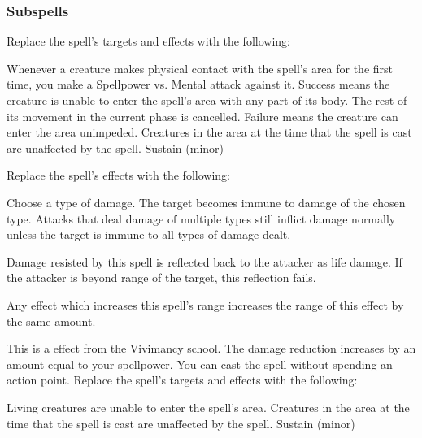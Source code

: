 \subsubsection{Subspells}
Replace the spell's targets and effects with the following:
\begin{spellcontent}
\begin{augmenttargetinginfo}
\end{augmenttargetinginfo}
\begin{augmenteffects}
\spelleffect
Whenever a creature makes physical contact with the spell's area for the first time, you make a Spellpower vs. Mental attack against it.
Success means the creature is unable to enter the spell's area with any part of its body.
The rest of its movement in the current phase is cancelled.
Failure means the creature can enter the area unimpeded.
Creatures in the area at the time that the spell is cast are unaffected by the spell.
\spelldur Sustain (minor)
\end{augmenteffects}
\end{spellcontent}
Replace the spell's effects with the following:
\begin{spellcontent}
\begin{augmenteffects}
\spelleffect
Choose a type of damage.
The target becomes immune to damage of the chosen type.
Attacks that deal damage of multiple types still inflict damage normally unless the target is immune to all types of damage dealt.
\end{augmenteffects}
\end{spellcontent}
Damage resisted by this spell is reflected back to the attacker as life damage.
If the attacker is beyond \rngclose range of the target, this reflection fails.
\par Any effect which increases this spell's range increases the range of this effect by the same amount.
\par
This is a  effect from the Vivimancy school.
The damage reduction increases by an amount equal to your spellpower.
You can cast the spell without spending an action point.
Replace the spell's targets and effects with the following:
\begin{spellcontent}
\begin{augmenttargetinginfo}
\end{augmenttargetinginfo}
\begin{augmenteffects}
\spelleffect
Living creatures are unable to enter the spell's area.
Creatures in the area at the time that the spell is cast are unaffected by the spell.
\spelldur Sustain (minor)
\end{augmenteffects}
\end{spellcontent}
